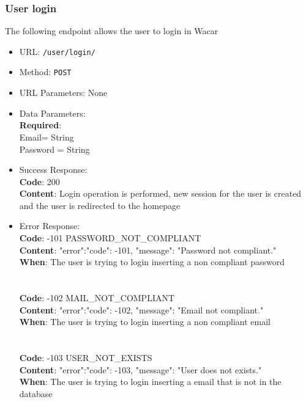 \subsubsection*{User login}


The following endpoint allows the user to login in Wacar

\begin{itemize}
    \item URL: \texttt{/user/login/}
    \item Method: \texttt{POST}
    \item URL Parameters: None
    \item Data Parameters: \\
    \textbf{Required}:\\
    Email= {String}\\
    Password = {String}\\
    \item Success Response:\\
    \textbf{Code}: 200\\
    \textbf{Content}: Login operation is performed, new session for the user is created and the user is redirected to the homepage\\
    \item Error Response:\\
    \textbf{Code}: -101 PASSWORD\_NOT\_COMPLIANT\\
    \textbf{Content}: {"error":{"code": -101, "message": "Password not compliant."}}\\
    \textbf{When}: The user is trying to login inserting a non compliant password\\
    \\
    \\
    \textbf{Code}: -102 MAIL\_NOT\_COMPLIANT\\
    \textbf{Content}: {"error":{"code": -102, "message": "Email not compliant."}}\\
    \textbf{When}: The user is trying to login inserting a non compliant email\\
    \\
    \\
    \textbf{Code}: -103 USER\_NOT\_EXISTS\\
    \textbf{Content}: {"error":{"code": -103, "message": "User does not exists."}}\\
    \textbf{When}: The user is trying to login inserting a email that is not in the database\\

\end{itemize}
